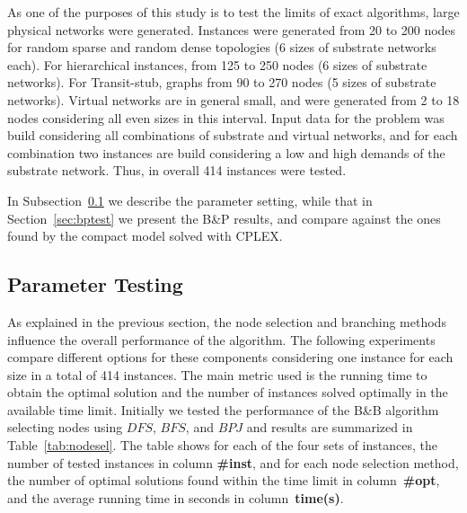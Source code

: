 \documentclass[conference]{IEEEtran}
\begin{document}
As one of the purposes of this study is to test the limits of exact algorithms, large physical networks were generated.
Instances were generated from 20 to 200 nodes for random sparse and random dense topologies (6 sizes of substrate networks each).
For hierarchical instances, from 125 to 250 nodes (6 sizes of substrate networks). 
For Transit-stub, graphs from 90 to 270 nodes (5 sizes of substrate networks).
Virtual networks are in general small, and were generated from 2 to 18 nodes considering all even sizes in this interval.
Input data for the problem was build considering all combinations of substrate and virtual networks, and for each combination two instances are build considering a low and high demands of the substrate network.
Thus, in overall 414 instances were tested.


In Subsection~\ref{sec:param} we describe the parameter setting, while that in Section~\ref{sec:bptest} we present the B\&P results, and compare against the ones found by the compact model solved with CPLEX.

\subsection{Parameter Testing}
\label{sec:param}

As explained in the previous section, the node selection and branching methods influence the overall performance of the algorithm.
The following experiments compare different options for these components considering one instance for each size in a total of 414 instances.
The main metric used is the running time to obtain the optimal solution and the number of instances solved optimally in the available time limit.
Initially we tested the performance of the B\&B algorithm selecting nodes using  $DFS$, $BFS$, and $BPJ$ and results are summarized in Table~\ref{tab:nodesel}. 
The table shows for each of the four sets of instances, the number of tested instances in column \textbf{\#inst}, and for each node selection method, the number of optimal solutions found within the time limit in column~\textbf{\#opt}, and the average running time in seconds in column~\textbf{time(s)}.
\end{document}
